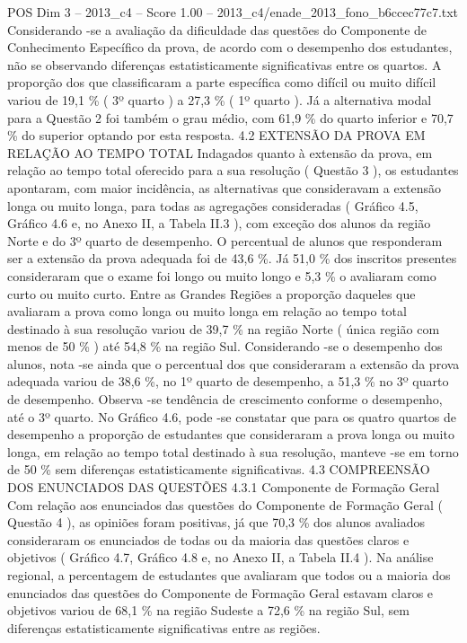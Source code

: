 \begin{textsample}{POS Dim 3 – 2013\_c4 – Score 1.00 – 2013\_c4/enade\_2013\_fono\_b6ccec77c7.txt}
Considerando -se a avaliação da dificuldade das questões do Componente de Conhecimento Específico da prova, de acordo com o desempenho dos estudantes, não se observando diferenças estatisticamente significativas entre os quartos.
A proporção dos que classificaram a parte específica como difícil ou muito difícil variou de 19,1 \% ( 3º quarto ) a 27,3 \% ( 1º quarto ).
Já a alternativa modal para a Questão 2 foi também o grau médio, com 61,9 \% do quarto inferior e 70,7 \% do superior optando por esta resposta. 4.2 EXTENSÃO DA PROVA EM RELAÇÃO AO TEMPO TOTAL Indagados quanto à extensão da prova, em relação ao tempo total oferecido para a sua resolução ( Questão 3 ), os estudantes apontaram, com maior incidência, as alternativas que consideravam a extensão longa ou muito longa, para todas as agregações consideradas ( Gráfico 4.5, Gráfico 4.6 e, no Anexo II, a Tabela II.3 ), com exceção dos alunos da região Norte e do 3º quarto de desempenho.
O percentual de alunos que responderam ser a extensão da prova adequada foi de 43,6 \%.
Já 51,0 \% dos inscritos presentes consideraram que o exame foi longo ou muito longo e 5,3 \% o avaliaram como curto ou muito curto.
Entre as Grandes Regiões a proporção daqueles que avaliaram a prova como longa ou muito longa em relação ao tempo total destinado à sua resolução variou de 39,7 \% na região Norte ( única região com menos de 50 \% ) até 54,8 \% na região Sul.
Considerando -se o desempenho dos alunos, nota -se ainda que o percentual dos que consideraram a extensão da prova adequada variou de 38,6 \%, no 1º quarto de desempenho, a 51,3 \% no 3º quarto de desempenho.
Observa -se tendência de crescimento conforme o desempenho, até o 3º quarto.
No Gráfico 4.6, pode -se constatar que para os quatro quartos de desempenho a proporção de estudantes que consideraram a prova longa ou muito longa, em relação ao tempo total destinado à sua resolução, manteve -se em torno de 50 \% sem diferenças estatisticamente significativas. 4.3 COMPREENSÃO DOS ENUNCIADOS DAS QUESTÕES 4.3.1 Componente de Formação Geral Com relação aos enunciados das questões do Componente de Formação Geral ( Questão 4 ), as opiniões foram positivas, já que 70,3 \% dos alunos avaliados consideraram os enunciados de todas ou da maioria das questões claros e objetivos ( Gráfico 4.7, Gráfico 4.8 e, no Anexo II, a Tabela II.4 ).
Na análise regional, a percentagem de estudantes que avaliaram que todos ou a maioria dos enunciados das questões do Componente de Formação Geral estavam claros e objetivos variou de 68,1 \% na região Sudeste a 72,6 \% na região Sul, sem diferenças estatisticamente significativas entre as regiões.

\end{textsample}
